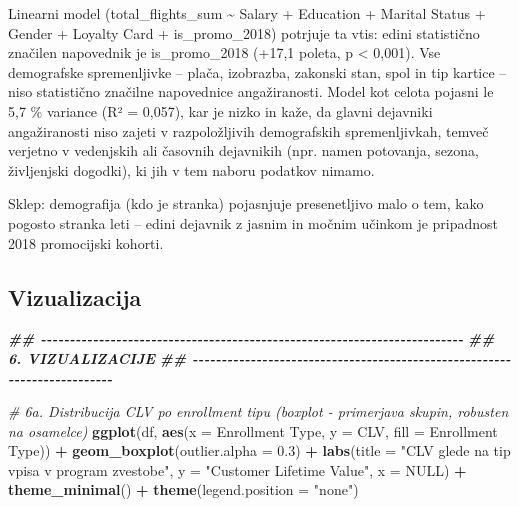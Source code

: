 \documentclass[
]{article}
\newenvironment{Shaded}{\begin{snugshade}}{\end{snugshade}}
\newcommand{\AttributeTok}[1]{\textcolor[rgb]{0.13,0.29,0.53}{#1}}
\newcommand{\CommentTok}[1]{\textcolor[rgb]{0.56,0.35,0.01}{\textit{#1}}}
\newcommand{\ConstantTok}[1]{\textcolor[rgb]{0.56,0.35,0.01}{#1}}
\newcommand{\DocumentationTok}[1]{\textcolor[rgb]{0.56,0.35,0.01}{\textbf{\textit{#1}}}}
\newcommand{\FloatTok}[1]{\textcolor[rgb]{0.00,0.00,0.81}{#1}}
\newcommand{\FunctionTok}[1]{\textcolor[rgb]{0.13,0.29,0.53}{\textbf{#1}}}
\newcommand{\NormalTok}[1]{#1}
\newcommand{\SpecialCharTok}[1]{\textcolor[rgb]{0.81,0.36,0.00}{\textbf{#1}}}
\newcommand{\StringTok}[1]{\textcolor[rgb]{0.31,0.60,0.02}{#1}}
\newcounter{none} %
\begin{document}
Linearni model (total\_flights\_sum \textasciitilde{} Salary + Education
+ Marital Status + Gender + Loyalty Card + is\_promo\_2018) potrjuje ta
vtis: edini statistično značilen napovednik je is\_promo\_2018 (+17,1
poleta, p \textless{} 0,001). Vse demografske spremenljivke -- plača,
izobrazba, zakonski stan, spol in tip kartice -- niso statistično
značilne napovednice angažiranosti. Model kot celota pojasni le 5,7 \%
variance (R² = 0,057), kar je nizko in kaže, da glavni dejavniki
angažiranosti niso zajeti v razpoložljivih demografskih spremenljivkah,
temveč verjetno v vedenjskih ali časovnih dejavnikih (npr. namen
potovanja, sezona, življenjski dogodki), ki jih v tem naboru podatkov
nimamo.

Sklep: demografija (kdo je stranka) pojasnjuje presenetljivo malo o tem,
kako pogosto stranka leti -- edini dejavnik z jasnim in močnim učinkom
je pripadnost 2018 promocijski kohorti.

\subsection{Vizualizacija}\label{vizualizacija-1}

\begin{Shaded}
\begin{Highlighting}[]
\DocumentationTok{\#\# {-}{-}{-}{-}{-}{-}{-}{-}{-}{-}{-}{-}{-}{-}{-}{-}{-}{-}{-}{-}{-}{-}{-}{-}{-}{-}{-}{-}{-}{-}{-}{-}{-}{-}{-}{-}{-}{-}{-}{-}{-}{-}{-}{-}{-}{-}{-}{-}{-}{-}{-}{-}{-}{-}{-}{-}{-}{-}{-}{-}{-}{-}{-}{-}{-}{-}{-}{-}{-}{-}{-}{-}{-}}
\DocumentationTok{\#\# 6. VIZUALIZACIJE}
\DocumentationTok{\#\# {-}{-}{-}{-}{-}{-}{-}{-}{-}{-}{-}{-}{-}{-}{-}{-}{-}{-}{-}{-}{-}{-}{-}{-}{-}{-}{-}{-}{-}{-}{-}{-}{-}{-}{-}{-}{-}{-}{-}{-}{-}{-}{-}{-}{-}{-}{-}{-}{-}{-}{-}{-}{-}{-}{-}{-}{-}{-}{-}{-}{-}{-}{-}{-}{-}{-}{-}{-}{-}{-}{-}{-}{-}}

\CommentTok{\# 6a. Distribucija CLV po enrollment tipu (boxplot {-} primerjava skupin, robusten na osamelce)}
\FunctionTok{ggplot}\NormalTok{(df, }\FunctionTok{aes}\NormalTok{(}\AttributeTok{x =} \StringTok{\textasciigrave{}}\AttributeTok{Enrollment Type}\StringTok{\textasciigrave{}}\NormalTok{, }\AttributeTok{y =}\NormalTok{ CLV, }\AttributeTok{fill =} \StringTok{\textasciigrave{}}\AttributeTok{Enrollment Type}\StringTok{\textasciigrave{}}\NormalTok{)) }\SpecialCharTok{+}
  \FunctionTok{geom\_boxplot}\NormalTok{(}\AttributeTok{outlier.alpha =} \FloatTok{0.3}\NormalTok{) }\SpecialCharTok{+}
  \FunctionTok{labs}\NormalTok{(}\AttributeTok{title =} \StringTok{"CLV glede na tip vpisa v program zvestobe"}\NormalTok{,}
       \AttributeTok{y =} \StringTok{"Customer Lifetime Value"}\NormalTok{, }\AttributeTok{x =} \ConstantTok{NULL}\NormalTok{) }\SpecialCharTok{+}
  \FunctionTok{theme\_minimal}\NormalTok{() }\SpecialCharTok{+}
  \FunctionTok{theme}\NormalTok{(}\AttributeTok{legend.position =} \StringTok{"none"}\NormalTok{)}
\end{Highlighting}
\end{Shaded}
\end{document}
